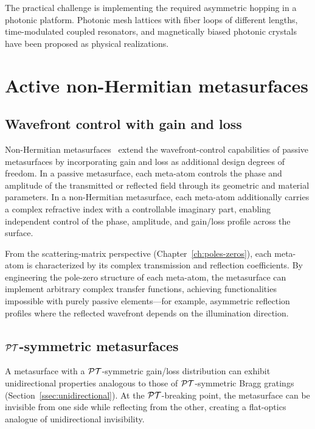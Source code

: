 The practical challenge is implementing the required asymmetric hopping
in a photonic platform. Photonic mesh lattices with fiber loops of
different lengths, time-modulated coupled resonators, and
magnetically biased photonic crystals have been proposed as physical
realizations.


\section{Active non-Hermitian metasurfaces}
\label{sec:nh-metasurfaces}

\subsection{Wavefront control with gain and loss}
\label{ssec:nh-wavefront}

Non-Hermitian metasurfaces~\cite{cui2024roadmap,ma2022information} extend the wavefront-control capabilities of
passive metasurfaces by incorporating gain and loss as additional design
degrees of freedom. In a passive metasurface, each meta-atom controls
the phase and amplitude of the transmitted or reflected field through
its geometric and material parameters. In a non-Hermitian metasurface,
each meta-atom additionally carries a complex refractive index with a
controllable imaginary part, enabling independent control of the phase,
amplitude, and gain/loss profile across the surface.

From the scattering-matrix perspective (Chapter~\ref{ch:poles-zeros}),
each meta-atom is characterized by its complex transmission and
reflection coefficients. By engineering the pole-zero structure of each
meta-atom, the metasurface can implement arbitrary complex transfer
functions, achieving functionalities impossible with purely passive
elements---for example, asymmetric reflection profiles where the
reflected wavefront depends on the illumination direction.

\subsection{$\mathcal{PT}$-symmetric metasurfaces}
\label{ssec:pt-metasurface}

A metasurface with a $\mathcal{PT}$-symmetric gain/loss distribution can exhibit
unidirectional properties analogous to those of $\mathcal{PT}$-symmetric Bragg
gratings (Section~\ref{ssec:unidirectional}). At the $\mathcal{PT}$-breaking
point, the metasurface can be invisible from one side while reflecting
from the other, creating a flat-optics analogue of unidirectional
invisibility.

